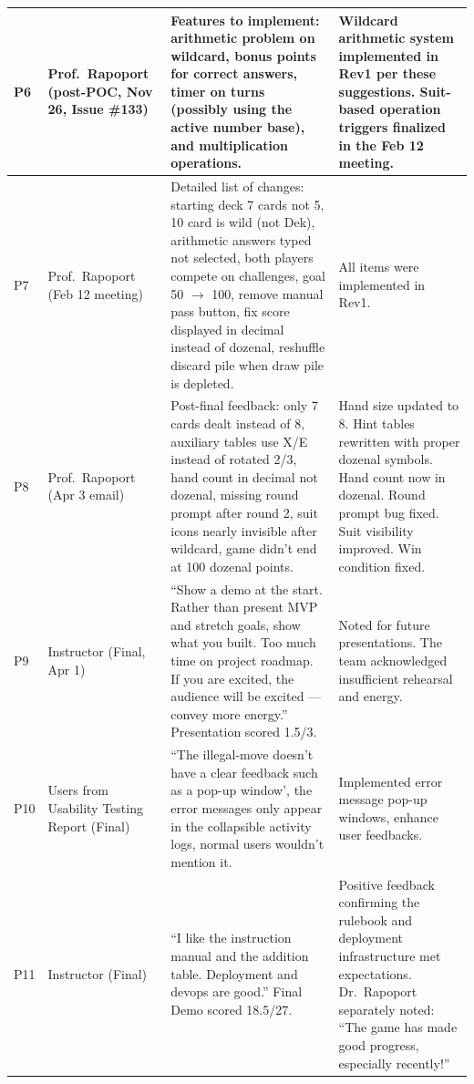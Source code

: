 \documentclass{article}
\begin{document}
\begin{longtable}{p{} p{} p{} p{}}
P6 & Prof.\ Rapoport (post-POC, Nov 26, Issue \#133) & Features to implement: arithmetic problem on wildcard, bonus points for correct answers, timer on turns (possibly using the active number base), and multiplication operations. & Wildcard arithmetic system implemented in Rev1 per these suggestions. Suit-based operation triggers finalized in the Feb 12 meeting. \\
\midrule

P7 & Prof.\ Rapoport (Feb 12 meeting) & Detailed list of changes: starting deck 7 cards not 5, 10 card is wild (not Dek), arithmetic answers typed not selected, both players compete on challenges, goal 50 $\rightarrow$ 100, remove manual pass button, fix score displayed in decimal instead of dozenal, reshuffle discard pile when draw pile is depleted. & All items were implemented in Rev1. \\
\midrule

P8 & Prof.\ Rapoport (Apr 3 email) & Post-final feedback: only 7 cards dealt instead of 8, auxiliary tables use X/E instead of rotated 2/3, hand count in decimal not dozenal, missing round prompt after round 2, suit icons nearly invisible after wildcard, game didn't end at 100 dozenal points. & Hand size updated to 8. Hint tables rewritten with proper dozenal symbols. Hand count now in dozenal. Round prompt bug fixed. Suit visibility improved. Win condition fixed.  \\
\midrule

P9 & Instructor (Final, Apr 1) & ``Show a demo at the start. Rather than present MVP and stretch goals, show what you built. Too much time on project roadmap. If you are excited, the audience will be excited --- convey more energy.'' Presentation scored 1.5/3. & Noted for future presentations. The team acknowledged insufficient rehearsal and energy. \\
\midrule

P10 & Users from Usability Testing Report (Final) & ``The illegal-move doesn't have a clear feedback such as a pop-up window', the error messages only appear in the collapsible activity logs, normal users wouldn't mention it. & Implemented error message pop-up windows, enhance user feedbacks.\\
\midrule

P11 & Instructor (Final) & ``I like the instruction manual and the addition table. Deployment and devops are good.'' Final Demo scored 18.5/27. & Positive feedback confirming the rulebook and deployment infrastructure met expectations. Dr.\ Rapoport separately noted: ``The game has made good progress, especially recently!'' \\

\end{longtable}
\end{document}
